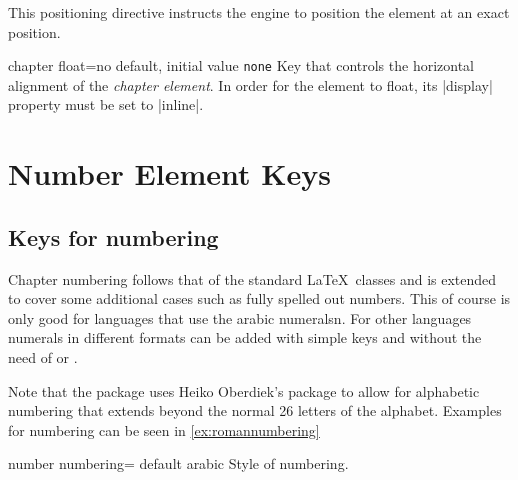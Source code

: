 This positioning directive instructs the engine to position the element at an exact position.


\begin{docKey}[]{chapter float}{=}{no default, initial value \texttt{none}}
Key that controls the horizontal alignment of the \emph{chapter element}. In order for the
element to float, its |display| property must be set to |inline|.
\end{docKey}
\egroup



\section{Number Element Keys}


\subsection{Keys for numbering}

Chapter numbering follows that of the standard \LaTeX\ classes and is extended to cover some additional cases such as fully spelled out numbers. This of course is only good for languages that use the arabic numeralsn. For other languages numerals in different formats can be added with simple keys and without the need of  or . 

Note that the package uses Heiko Oberdiek's package  to allow for alphabetic numbering that extends beyond the normal 26 letters of the alphabet. Examples for numbering can be seen in \ref{ex:romannumbering}


\begin{docKey}{number numbering}{= }{default arabic}
Style of numbering.
\end{docKey}

